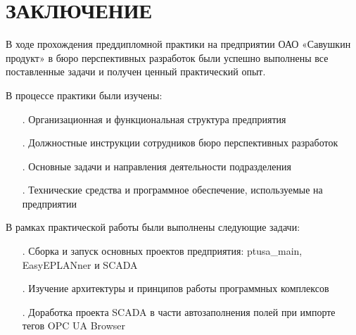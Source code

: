 \sectionbreak \section*{
\gostTitleFont
\redline
ЗАКЛЮЧЕНИЕ
}

\subtitlespace

{\gostFont
\par \redline В ходе прохождения преддипломной практики на предприятии ОАО «Савушкин продукт» в бюро перспективных разработок были успешно выполнены все поставленные задачи и получен ценный практический опыт.

\par \redline В процессе практики были изучены:
\begin{itemize}[leftmargin=2.15cm, labelwidth=0.65cm, labelsep=0.0cm] 

\item[\theitemcntr.] Организационная и функциональная структура предприятия
\addtocounter{itemcntr}{1}

\item[\theitemcntr.] Должностные инструкции сотрудников бюро перспективных разработок
\addtocounter{itemcntr}{1}

\item[\theitemcntr.] Основные задачи и направления деятельности подразделения
\addtocounter{itemcntr}{1}

\item[\theitemcntr.] Технические средства и программное обеспечение, используемые на предприятии
\addtocounter{itemcntr}{1}

\setcounter{itemcntr}{1}
\end{itemize}

\par \redline В рамках практической работы были выполнены следующие задачи:
\begin{itemize}[leftmargin=2.15cm, labelwidth=0.65cm, labelsep=0.0cm] 

\item[\theitemcntr.] Сборка и запуск основных проектов предприятия: ptusa\_main, EasyEPLANner и SCADA
\addtocounter{itemcntr}{1}

\item[\theitemcntr.] Изучение архитектуры и принципов работы программных комплексов
\addtocounter{itemcntr}{1}

\item[\theitemcntr.] Доработка проекта SCADA в части автозаполнения полей при импорте тегов OPC UA Browser
\addtocounter{itemcntr}{1}


\end{itemize}}
